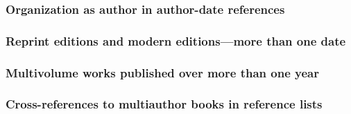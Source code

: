 \documentclass[11pt,letterpaper,oneside]{article}
\begin{document}
\subsubsection{Organization as author in author-date references}

\begin{citeref}
\item \parencite{iso1997.ref}
\end{citeref}

\setcounter{subsubsection}{39}
\subsubsection{Reprint editions and modern editions—more than one date}

\begin{citeref}
\item \parencite{austen2003}
\item \parencite{maitland1998}
\end{citeref}

\subsubsection{Multivolume works published over more than one year}

\begin{citeref}
\item \parencite[1:133]{tillich1951}
\item \parencite[vol. 2]{tillich1951}
\item \parencite[329]{hayek1988}
\end{citeref}

\subsubsection{Cross-references to multiauthor books in reference lists}

\begin{citebib}
\item \cite{draper1987}
\item \cite{harrington1987}
\item \cite{zukowsky1987}
\end{citebib}
\end{document}
